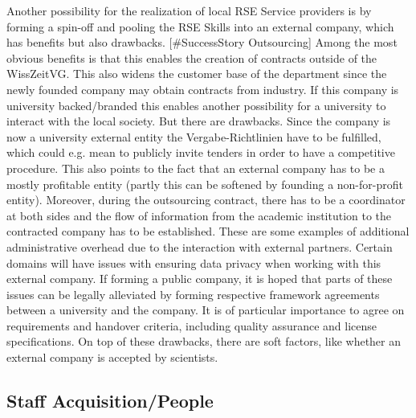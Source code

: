 \documentclass[a4paper]{article}
\begin{document}
Another possibility for the realization of local RSE Service providers is by forming a spin-off and pooling the RSE Skills into an external company, which has benefits but also drawbacks. [\#SuccessStory Outsourcing]
Among the most obvious benefits is that this enables the creation of contracts outside of the WissZeitVG.
This also widens the customer base of the department since the newly founded company may obtain contracts from industry.
If this company is university backed/branded this enables another possibility for a university to interact with the local society. 
But there are drawbacks.
Since the company is now a university external entity the Vergabe-Richtlinien have to be fulfilled, which could e.g. mean to publicly invite tenders in order to have a competitive procedure.
This also points to the fact that an external company has to be a mostly profitable entity (partly this can be softened by founding a non-for-profit entity).
Moreover, during the outsourcing contract, there has to be a coordinator at both sides and the flow of information from the academic institution to the contracted company has to be established.
These are some examples of additional administrative overhead due to the interaction with external partners.
Certain domains will have issues with ensuring data privacy when working with this external company.
If forming a public company, it is hoped that parts of these issues can be legally alleviated by forming respective framework agreements between a university and the company.
It is of particular importance to agree on requirements and handover criteria, including quality assurance and license specifications.
On top of these drawbacks, there are soft factors, like whether an external company is accepted by scientists.

\subsection{Staff Acquisition/People}
\end{document}
